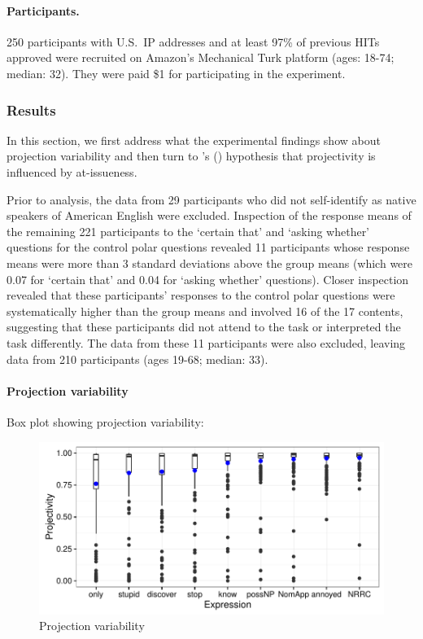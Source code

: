 \documentclass[11pt,fleqn]{article}
\newcommand{\6}{\mbox{$[\hspace*{-.6mm}[$}}
\newcommand{\9}{\mbox{$]\hspace*{-.6mm}]$}}
\newcommand{\citetpos}[1]{\citeauthor{#1}'s (\citeyear{#1})}
\begin{document}
\paragraph{Participants.} 250 participants with U.S.\ IP addresses and at least 97\% of previous HITs approved were recruited on Amazon's Mechanical Turk platform (ages: 18-74; median: 32). They were paid \$1 for participating in the experiment. 


\subsubsection{Results}

In this section, we first address what the experimental findings show about projection variability and then turn to \citetpos{brst-salt10} hypothesis that projectivity is influenced by at-issueness. 

Prior to analysis, the data from 29 participants who did not self-identify as native speakers of American English were excluded. Inspection of the response means of the remaining 221 participants to the `certain that' and `asking whether' questions for the control polar questions revealed 11 participants whose response means were more than 3 standard deviations above the group means (which were 0.07 for `certain that' and 0.04 for `asking whether' questions). Closer inspection revealed that these participants' responses to the control polar questions were systematically higher than the group means and involved 16 of the 17 contents, suggesting that these participants did not attend to the task or interpreted the task differently. The data from these 11 participants were also excluded, leaving data from 210 participants (ages 19-68; median: 33).  

\paragraph{Projection variability}

Box plot showing projection variability:

\begin{figure}[!h]

\begin{center}
\includegraphics[width=12cm]{../results/exp1a/graphs/boxplot-projection}

\end{center}

\caption{Projection variability}\label{f-proj-1a}
\end{figure}
\end{document}
